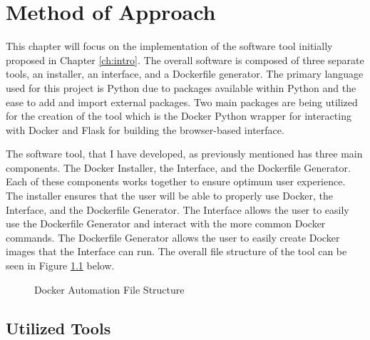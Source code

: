 \chapter{Method of Approach}
\label{ch:method}

This chapter will focus on the implementation of the software tool initially proposed in Chapter \ref{ch:intro}. The overall software is composed of three separate tools, an installer, an interface, and a Dockerfile generator. The primary language used for this project is Python due to packages available within Python and the ease to add and import external packages. Two main packages are being utilized for the creation of the tool which is the Docker Python \cite{dockerPython} wrapper for interacting with Docker and Flask \cite{flask} for building the browser-based interface.

\break


The software tool, that I have developed, as previously mentioned has three main components. The Docker Installer, the Interface, and the Dockerfile Generator. Each of these components works together to ensure optimum user experience. The installer ensures that the user will be able to properly use Docker, the Interface, and the Dockerfile Generator. The Interface allows the user to easily use the Dockerfile Generator and interact with the more common Docker commands. The Dockerfile Generator allows the user to easily create Docker images that the Interface can run. The overall file structure of the tool can be seen in Figure \ref{fig:fileStruct} below.

\begin{figure}[h!]
  
  \caption{Docker Automation File Structure}
  \label{fig:fileStruct}
\end{figure}


\section{Utilized Tools}
\label{sec:tools}

